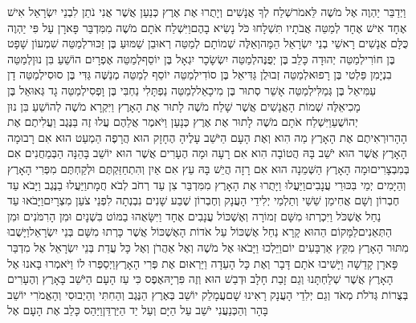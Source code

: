 \documentclass[../main/main.tex]{subfiles}
\begin{document}
\begin{multicols*}{\ncols}
וַיְדַבֵּר יַהְוֶה אֶל מֹשֶׁה לֵּאמֹר\PreVerseSpace{}שְׁלַח לְךָ אֲנָשִׁים וְיָתֻרוּ אֶת אֶרֶץ כְּנַעַן אֲשֶׁר אֲנִי נֹתֵן לִבְנֵי יִשְׂרָאֵל אִישׁ אֶחָד אִישׁ אֶחָד לְמַטֵּה אֲבֹתָיו תִּשְׁלָחוּ כֹּל נָשִׂיא בָהֶם\PreVerseSpace{}וַיִּשְׁלַח אֹתָם מֹשֶׁה מִמִּדְבַּר פָּארָן עַל פִּי יַהְוֶה כֻּלָּם אֲנָשִׁים רָאשֵׁי בְנֵי יִשְׂרָאֵל הֵמָּה\PreVerseSpace{}וְאֵלֶּה שְׁמוֹתָם לְמַטֵּה רְאוּבֵן שַׁמּוּעַ בֶּן זַכּוּר\PreVerseSpace{}לְמַטֵּה שִׁמְעוֹן שָׁפָט בֶּן חוֹרִי\PreVerseSpace{}לְמַטֵּה יְהוּדָה כָּלֵב בֶּן יְפֻנֶּה\PreVerseSpace{}לְמַטֵּה יִשְׂשָׂכָר יִגְאָל בֶּן יוֹסֵף\PreVerseSpace{}לְמַטֵּה אֶפְרָיִם הוֹשֵׁעַ בִּן נוּן\PreVerseSpace{}לְמַטֵּה בִנְיָמִן פַּלְטִי בֶּן רָפוּא\PreVerseSpace{}לְמַטֵּה זְבוּלֻן גַּדִּיאֵל בֶּן סוֹדִי\PreVerseSpace{}לְמַטֵּה יוֹסֵף לְמַטֵּה מְנַשֶּׁה גַּדִּי בֶּן סוּסִי\PreVerseSpace{}לְמַטֵּה דָן עַמִּיאֵל בֶּן גְּמַלִּי\PreVerseSpace{}לְמַטֵּה אָשֵׁר סְתוּר בֶּן מִיכָאֵל\PreVerseSpace{}לְמַטֵּה נַפְתָּלִי נַחְבִּי בֶּן וָפְסִי\PreVerseSpace{}לְמַטֵּה גָד גְּאוּאֵל בֶּן מָכִי\PreVerseSpace{}אֵלֶּה שְׁמוֹת הָאֲנָשִׁים אֲשֶׁר שָׁלַח מֹשֶׁה לָתוּר אֶת הָאָרֶץ וַיִּקְרָא מֹשֶׁה לְהוֹשֵׁעַ בִּן נוּן יְהוֹשֻׁעַ\PreVerseSpace{}וַיִּשְׁלַח אֹתָם מֹשֶׁה לָתוּר אֶת אֶרֶץ כְּנָעַן וַיֹּאמֶר אֲלֵהֶם עֲלוּ זֶה בַּנֶּגֶב וַעֲלִיתֶם אֶת הָהָר\PreVerseSpace{}וּרְאִיתֶם אֶת הָאָרֶץ מַה הִוא וְאֶת הָעָם הַיֹּשֵׁב עָלֶיהָ הֶחָזָק הוּא הֲרָפֶה הַמְעַט הוּא אִם רָב\PreVerseSpace{}וּמָה הָאָרֶץ אֲשֶׁר הוּא יֹשֵׁב בָּהּ הֲטוֹבָה הִוא אִם רָעָה וּמָה הֶעָרִים אֲשֶׁר הוּא יוֹשֵׁב בָּהֵנָּה הַבְּמַחֲנִים אִם בְּמִבְצָרִים\PreVerseSpace{}וּמָה הָאָרֶץ הַשְּׁמֵנָה הוּא אִם רָזָה הֲיֵשׁ בָּהּ עֵץ אִם אַיִן וְהִתְחַזַּקְתֶּם וּלְקַחְתֶּם מִפְּרִי הָאָרֶץ וְהַיָּמִים יְמֵי בִּכּוּרֵי עֲנָבִים\PreVerseSpace{}וַיַּעֲלוּ וַיָּתֻרוּ אֶת הָאָרֶץ מִמִּדְבַּר צִן עַד רְחֹב לְבֹא חֲמָת\PreVerseSpace{}וַיַּעֲלוּ בַנֶּגֶב וַיָּבֹא עַד חֶבְרוֹן וְשָׁם אֲחִימַן שֵׁשַׁי וְתַלְמַי יְלִידֵי הָעֲנָק וְחֶבְרוֹן שֶׁבַע שָׁנִים נִבְנְתָה לִפְנֵי צֹעַן מִצְרָיִם\PreVerseSpace{}וַיָּבֹאוּ עַד נַחַל אֶשְׁכֹּל וַיִּכְרְתוּ מִשָּׁם זְמוֹרָה וְאֶשְׁכּוֹל עֲנָבִים אֶחָד וַיִּשָּׂאֻהוּ בַמּוֹט בִּשְׁנָיִם וּמִן הָרִמֹּנִים וּמִן הַתְּאֵנִים\PreVerseSpace{}לַמָּקוֹם הַהוּא קָרָא נַחַל אֶשְׁכּוֹל עַל אֹדוֹת הָאֶשְׁכּוֹל אֲשֶׁר כָּרְתוּ מִשָּׁם בְּנֵי יִשְׂרָאֵל\PreVerseSpace{}וַיָּשֻׁבוּ מִתּוּר הָאָרֶץ מִקֵּץ אַרְבָּעִים יוֹם\PreVerseSpace{}וַיֵּלְכוּ וַיָּבֹאוּ אֶל מֹשֶׁה וְאֶל אַהֲרֹן וְאֶל כָּל עֲדַת בְּנֵי יִשְׂרָאֵל אֶל מִדְבַּר פָּארָן קָדֵשָׁה וַיָּשִׁיבוּ אֹתָם דָּבָר וְאֶת כָּל הָעֵדָה וַיַּרְאוּם אֶת פְּרִי הָאָרֶץ\PreVerseSpace{}וַיְסַפְּרוּ לוֹ וַיֹּאמְרוּ בָּאנוּ אֶל הָאָרֶץ אֲשֶׁר שְׁלַחְתָּנוּ וְגַם זָבַת חָלָב וּדְבַשׁ הוּא וְזֶה פִּרְיָהּ\PreVerseSpace{}אֶפֶס כִּי עַז הָעָם הַיֹּשֵׁב בָּאָרֶץ וְהֶעָרִים בְּצֻרוֹת גְּדֹלֹת מְאֹד וְגַם יְלִדֵי הָעֲנָק רָאִינוּ שָׁם\PreVerseSpace{}עֲמָלֵק יוֹשֵׁב בְּאֶרֶץ הַנֶּגֶב וְהַחִתִּי וְהַיְבוּסִי וְהָאֱמֹרִי יוֹשֵׁב בָּהָר וְהַכְּנַעֲנִי יֹשֵׁב עַל הַיָּם וְעַל יַד הַיַּרְדֵּן\PreVerseSpace{}וַיַּהַס כָּלֵב אֶת הָעָם אֶל 
\end{multicols*}
\end{document}
